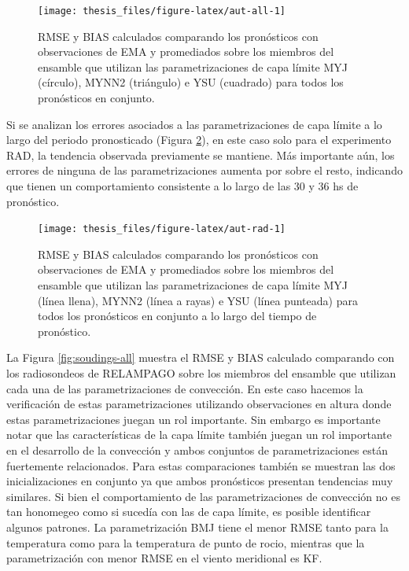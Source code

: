 \documentclass[12pt,oneside,a4paper]{reedthesis}
\begin{document}
\begin{figure}

{\centering \texttt{[image: thesis\_files/figure-latex/aut-all-1]} 

}

\caption{RMSE y BIAS calculados comparando los pronósticos con observaciones de EMA y promediados sobre los miembros del ensamble que utilizan las parametrizaciones de capa límite MYJ (círculo), MYNN2 (triángulo) e YSU (cuadrado) para todos los pronósticos en conjunto.}\label{fig:aut-all}
\end{figure}
Si se analizan los errores asociados a las parametrizaciones de capa límite a lo largo del periodo pronosticado (Figura \ref{fig:aut-rad}), en este caso solo para el experimento RAD, la tendencia observada previamente se mantiene. Más importante aún, los errores de ninguna de las parametrizaciones aumenta por sobre el resto, indicando que tienen un comportamiento consistente a lo largo de las 30 y 36 hs de pronóstico.


\begin{figure}

{\centering \texttt{[image: thesis\_files/figure-latex/aut-rad-1]} 

}

\caption{RMSE y BIAS calculados comparando los pronósticos con observaciones de EMA y promediados sobre los miembros del ensamble que utilizan las parametrizaciones de capa límite MYJ (línea llena), MYNN2 (línea a rayas) e YSU (línea punteada) para todos los pronósticos en conjunto a lo largo del tiempo de pronóstico.}\label{fig:aut-rad}
\end{figure}
La Figura \ref{fig:soudings-all} muestra el RMSE y BIAS calculado comparando con los radiosondeos de RELAMPAGO sobre los miembros del ensamble que utilizan cada una de las parametrizaciones de convección. En este caso hacemos la verificación de estas parametrizaciones utilizando observaciones en altura donde estas parametrizaciones juegan un rol importante. Sin embargo es importante notar que las características de la capa límite también juegan un rol importante en el desarrollo de la convección y ambos conjuntos de parametrizaciones están fuertemente relacionados. Para estas comparaciones también se muestran las dos inicializaciones en conjunto ya que ambos pronósticos presentan tendencias muy similares. Si bien el comportamiento de las parametrizaciones de convección no es tan honomegeo como si sucedía con las de capa límite, es posible identificar algunos patrones. La parametrización BMJ tiene el menor RMSE tanto para la temperatura como para la temperatura de punto de rocio, mientras que la parametrización con menor RMSE en el viento meridional es KF.
\end{document}
